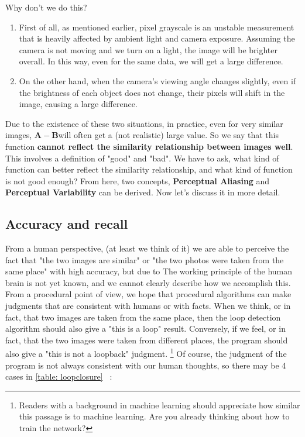 Why don't we do this?

\begin{enumerate}
\item First of all, as mentioned earlier, pixel grayscale is an unstable measurement that is heavily affected by ambient light and camera exposure. Assuming the camera is not moving and we turn on a light, the image will be brighter overall. In this way, even for the same data, we will get a large difference.
\item On the other hand, when the camera's viewing angle changes slightly, even if the brightness of each object does not change, their pixels will shift in the image, causing a large difference.
\end{enumerate}

Due to the existence of these two situations, in practice, even for very similar images, $\bm{A}-\bm{B} $will often get a (not realistic) large value. So we say that this function \textbf{cannot reflect the similarity relationship between images well}. This involves a definition of "good" and "bad". We have to ask, what kind of function can better reflect the similarity relationship, and what kind of function is not good enough? From here, two concepts, \textbf{Perceptual Aliasing} and \textbf{Perceptual Variability} can be derived. Now let's discuss it in more detail.

\subsection{Accuracy and recall}
From a human perspective, (at least we think of it) we are able to perceive the fact that "the two images are similar" or "the two photos were taken from the same place" with high accuracy, but due to The working principle of the human brain is not yet known, and we cannot clearly describe how we accomplish this. From a procedural point of view, we hope that procedural algorithms can make judgments that are consistent with humans or with facts. When we think, or in fact, that two images are taken from the same place, then the loop detection algorithm should also give a "this is a loop" result. Conversely, if we feel, or in fact, that the two images were taken from different places, the program should also give a "this is not a loopback" judgment. \footnote{Readers with a background in machine learning should appreciate how similar this passage is to machine learning. Are you already thinking about how to train the network? } Of course, the judgment of the program is not always consistent with our human thoughts, so there may be 4 cases in \autoref{table: loopclosure} ~:

